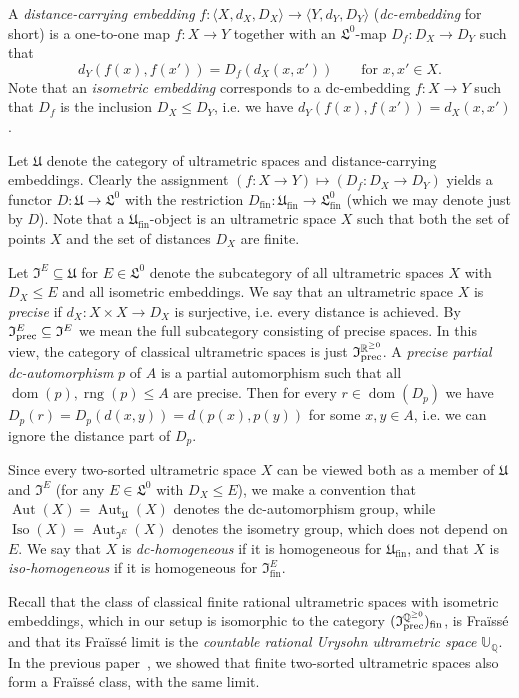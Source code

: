 \documentclass[oneside,notitlepage,12pt]{article}
\theoremstyle{definition}
\theoremstyle{remark}
\newcommand \seq [1]{\langle #1 \rangle}
\newcommand \maps {\colon} %
\newcommand \dom {\operatorname{dom}}
\newcommand \rng {\operatorname{rng}}
\newcommand \subs {\subseteq}
\newcommand \Q {\mathbb{Q}}
\newcommand \R {\mathbb{R}}
\newcommand \Qpos {\Q^{\geq 0}}
\newcommand \Rpos {\R^{\geq 0}}
\newcommand \U {\mathbb{U}}
\newcommand \fin {{\operatorname{fin}}}
\newcommand \Lin {\mathfrak{L}}
\newcommand \Ult {\mathfrak{U}}
\newcommand \UltIso {\mathfrak{I}}
\newcommand \Aut {\operatorname{Aut}}
\newcommand \Iso {\operatorname{Iso}}
\begin{document}
A \emph{distance-carrying embedding} $f\maps \seq{X, d_X, D_X} \to \seq{Y, d_Y, D_Y}$ (\emph{dc-embedding} for short) is a one-to-one map $f\maps X \to Y$ together with an $\Lin^0$-map $D_f\maps D_X \to D_Y$ such that
\[
    d_Y(f(x), f(x')) = D_f(d_X(x, x')) \qquad \text{for } x, x' \in X.
\]
Note that an \emph{isometric embedding} corresponds to a dc-embedding $f\maps X \to Y$ such that $D_f$ is the inclusion $D_X \leq D_Y$, i.e. we have $d_Y(f(x), f(x')) = d_X(x, x')$.



Let $\Ult$ denote the category of ultrametric spaces and distance-carrying embeddings.
Clearly the assignment $(f\maps X \to Y) \mapsto (D_f\maps D_X \to D_Y)$ yields a functor $D\maps \Ult \to \Lin^0$ with the restriction $D_\fin \maps \Ult_\fin \to \Lin^0_\fin$ (which we may denote just by $D$).
Note that a $\Ult_\fin$-object is an ultrametric space $X$ such that both the set of points $X$ and the set of distances $D_X$ are finite.

Let $\UltIso^E \subs \Ult$ for $E \in \Lin^0$ denote the subcategory of all ultrametric spaces $X$ with $D_X \leq E$ and all isometric embeddings.
We say that an ultrametric space $X$ is \emph{precise} if $d_X\maps X \times X \to D_X$ is surjective, i.e. every distance is achieved.
By $\UltIso^E_{\rm prec} \subs \UltIso^E$
  we mean the full subcategory consisting of precise spaces. 
In this view, the category of classical ultrametric spaces is just $\UltIso^{\Rpos}_{\rm prec}$.
A {\it precise partial dc-automorphism} $p$ of $A$ is a  partial automorphism such that all $\dom(p), \rng(p) \leq A$ are precise.
Then for every $r \in \dom(D_p)$ we have $D_p(r) = D_p(d(x, y)) = d(p(x), p(y))$ for some $x, y \in A$, i.e.  we can ignore the distance part of $D_p$.


Since every two-sorted ultrametric space $X$ can be viewed both as a member of $\Ult$ and $\UltIso^E$ (for any $E \in \Lin^0$ with $D_X \leq E$), we make a convention that $\Aut(X) = \Aut_{\Ult}(X)$ denotes the dc-automorphism group, while $\Iso(X) = \Aut_{\UltIso^E}(X)$ denotes the isometry group, which does not depend on $E$.
We say that $X$ is \emph{dc-homogeneous} if it is homogeneous for $\Ult_\fin$, and that $X$ is \emph{iso-homogeneous} if it is homogeneous for $\UltIso^E_\fin$.

Recall that the class of classical finite rational ultrametric spaces with isometric embeddings, which in our setup is isomorphic to the category $(\UltIso^{\Qpos}_{\rm prec})_\fin$, is Fraïssé and that its Fraïssé limit is the \emph{countable rational Urysohn ultrametric space} $\U_\Q$.
In the previous paper~\cite{paper1}, we showed that finite two-sorted ultrametric spaces also  form a Fraïssé class, with the same limit.
\end{document}
